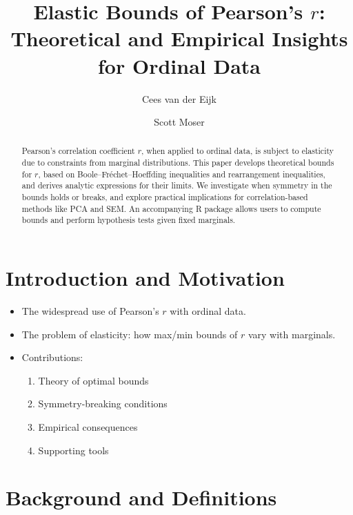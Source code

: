 \documentclass[
  12pt,
]{article}
\title{Elastic Bounds of Pearson's \(r\): Theoretical and Empirical
Insights for Ordinal Data}
\author{Cees van der Eijk \and Scott Moser}
\date{}
\providecommand{\tightlist}{%
  \setlength{\itemsep}{0pt}\setlength{\parskip}{0pt}}\usepackage{longtable,booktabs,array}
\renewcommand*\contentsname{Table of contents}
\newcommand\contentsname{Table of contents}
\begin{document}
\maketitle

\renewcommand*\contentsname{Table of contents}
{
\hypersetup{linkcolor=}
\setcounter{tocdepth}{3}
\tableofcontents
}

\begin{abstract}
Pearson’s correlation coefficient $r$, when applied to ordinal data, is subject to elasticity due to constraints from marginal distributions. This paper develops theoretical bounds for $r$, based on Boole–Fréchet–Hoeffding inequalities and rearrangement inequalities, and derives analytic expressions for their limits. We investigate when symmetry in the bounds holds or breaks, and explore practical implications for correlation-based methods like PCA and SEM. An accompanying R package allows users to compute bounds and perform hypothesis tests given fixed marginals.
\end{abstract}

\section{Introduction and Motivation}\label{introduction-and-motivation}

\begin{itemize}
\item
  The widespread use of Pearson's \(r\) with ordinal data.\\
\item
  The problem of elasticity: how max/min bounds of \(r\) vary with
  marginals.\\
\item
  Contributions:

  \begin{enumerate}
  \def\labelenumi{\arabic{enumi}.}
  \tightlist
  \item
    Theory of optimal bounds\\
  \item
    Symmetry-breaking conditions\\
  \item
    Empirical consequences\\
  \item
    Supporting tools
  \end{enumerate}
\end{itemize}

\section{Background and Definitions}\label{background-and-definitions}
\end{document}
